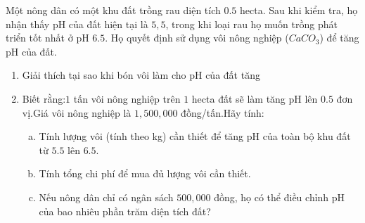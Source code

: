 \begin{bt}
	Một nông dân có một khu đất trồng rau diện tích $0.5$ hecta. Sau khi kiểm tra, họ nhận thấy pH của đất hiện tại là $5{,}5$, trong khi loại rau họ muốn trồng phát triển tốt nhất ở pH $6.5$. Họ quyết định sử dụng vôi nông nghiệp ($CaCO_3$) để tăng pH của đất.
	\begin{enumerate}
		\item Giải thích tại sao khi bón vôi làm cho pH của đất tăng
		\item Biết rằng:$1$ tấn vôi nông nghiệp trên $1$ hecta đất sẽ làm tăng pH lên $0.5$ đơn vị.Giá vôi nông nghiệp là $1{,}500{,}000$ đồng/tấn.Hãy tính:
		\begin{enumerate}[a)]
			\item Tính lượng vôi (tính theo kg) cần thiết để tăng pH của toàn bộ khu đất từ $5.5$ lên $6.5$.
			\item Tính tổng chi phí để mua đủ lượng vôi cần thiết.
			\item Nếu nông dân chỉ có ngân sách $500{,}000$ đồng, họ có thể điều chỉnh pH của bao nhiêu phần trăm diện tích đất?
		\end{enumerate}
	\end{enumerate}
\end{bt}
